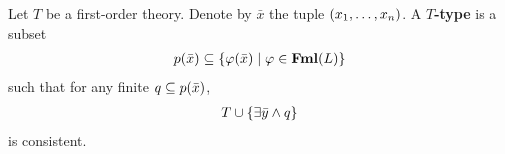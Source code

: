 \begin{boxdefinition}[$T$-Type]
    Let $T$ be a first-order theory. Denote by $\bar{x}$ the tuple $\left( x_1, \ldots, x_n \right)$. A \textbf{$T$-type} is a subset
    \begin{align*}
        p\!\left( \bar{x} \right) \subseteq \left\{ \varphi\!\left( \bar{x} \right) \; \middle\vert \; \varphi \in \mathbf{Fml}(L) \right\}
    \end{align*}
    such that for any finite $q \subseteq p\!\left( \bar{x} \right)$,
    \begin{align*}
        T \cup \left\{ \exists \bar{y} \land q \right\}
    \end{align*}
    is consistent.
\end{boxdefinition}